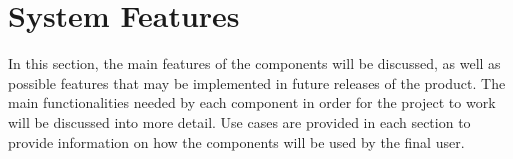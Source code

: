 \section{System Features}

In this section, the main features of the components will be discussed, as well as possible features that may be implemented in future releases of the product.
The main functionalities needed by each component in order for the project to work will be discussed into more detail. \newline
Use cases are provided in each section to provide information on how the components will be used by the final user. 

\label{sec:system-features}




